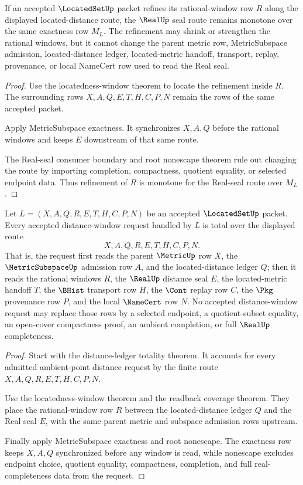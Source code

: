 \begin{theorem}
\label{thm:located-set-real-seal-window-monotonicity}
If an accepted $\LocatedSetUp$ packet refines its rational-window row $R$ along the displayed located-distance route, the $\RealUp$ seal route remains monotone over the same exactness row $M_L$. The refinement may shrink or strengthen the rational windows, but it cannot change the parent metric row, MetricSubspace admission, located-distance ledger, located-metric handoff, transport, replay, provenance, or local NameCert row used to read the Real seal.
\end{theorem}
\begin{proof}
Use the locatedness-window theorem to locate the refinement inside $R$. The surrounding rows $X,A,Q,E,T,H,C,P,N$ remain the rows of the same accepted packet.

Apply MetricSubspace exactness. It synchronizes $X,A,Q$ before the rational windows and keeps $E$ downstream of that same route.

The Real-seal consumer boundary and root nonescape theorem rule out changing the route by importing completion, compactness, quotient equality, or selected endpoint data. Thus refinement of $R$ is monotone for the Real-seal route over $M_L$.
\end{proof}

\begin{theorem}
\label{thm:located-set-obligation-distance-window-totality}
Let $L=(X,A,Q,R,E,T,H,C,P,N)$ be an accepted $\LocatedSetUp$ packet. Every accepted distance-window request handled by $L$ is total over the displayed route
$$
X,A,Q,R,E,T,H,C,P,N .
$$
That is, the request first reads the parent $\MetricUp$ row $X$, the $\MetricSubspaceUp$ admission row $A$, and the located-distance ledger $Q$; then it reads the rational windows $R$, the $\RealUp$ distance seal $E$, the located-metric handoff $T$, the $\BHist$ transport row $H$, the $\Cont$ replay row $C$, the $\Pkg$ provenance row $P$, and the local $\NameCert$ row $N$. No accepted distance-window request may replace those rows by a selected endpoint, a quotient-subset equality, an open-cover compactness proof, an ambient completion, or full $\RealUp$ completeness.
\end{theorem}
\begin{proof}
Start with the distance-ledger totality theorem. It accounts for every admitted ambient-point distance request by the finite route $X,A,Q,R,E,T,H,C,P,N$.

Use the locatedness-window theorem and the readback coverage theorem. They place the rational-window row $R$ between the located-distance ledger $Q$ and the Real seal $E$, with the same parent metric and subspace admission rows upstream.

Finally apply MetricSubspace exactness and root nonescape. The exactness row keeps $X,A,Q$ synchronized before any window is read, while nonescape excludes endpoint choice, quotient equality, compactness, completion, and full real-completeness data from the request.
\end{proof}

